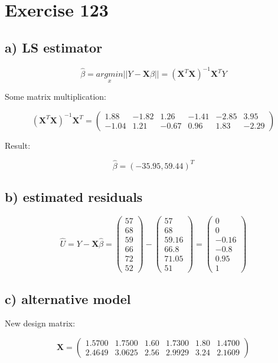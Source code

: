 \documentclass[11pt,a4paper]{article}
\begin{document}
\section*{Exercise 123}

\subsection*{a) LS estimator}

\[ \hat{\beta} = \underset{x}{argmin} ||Y - \mathbf{X}\beta|| =
  (\mathbf{X}^T \mathbf{X})^{-1} \mathbf{X}^T Y \]

Some matrix multiplication:

\[ (\mathbf{X}^T \mathbf{X})^{-1} \mathbf{X}^T =
\begin{pmatrix}
  1.88 & -1.82 &  1.26 & -1.41 & -2.85 &  3.95 \\
 -1.04 &  1.21 & -0.67 &  0.96 &  1.83 & -2.29
\end{pmatrix}
\]

Result:

\[ \hat{\beta} = (-35.95, 59.44)^T \]


\subsection*{b) estimated residuals}

\[
  \hat{U} = Y - \mathbf{X}\hat{\beta} =
  \begin{pmatrix} 57\\68\\59\\66\\72\\52 \end{pmatrix}
  -
  \begin{pmatrix} 57\\68\\59.16\\66.8\\71.05\\51 \end{pmatrix}
  =
  \begin{pmatrix} 0\\0\\-0.16\\-0.8\\0.95\\1 \end{pmatrix}
\]

\subsection*{c) alternative model}

New design matrix:

\[
  \mathbf{X}
  =
  \begin{pmatrix}
    1.5700 & 1.7500 & 1.60 & 1.7300 & 1.80 & 1.4700 \\
    2.4649 & 3.0625 & 2.56 & 2.9929 & 3.24 & 2.1609
  \end{pmatrix}
\]
\end{document}
